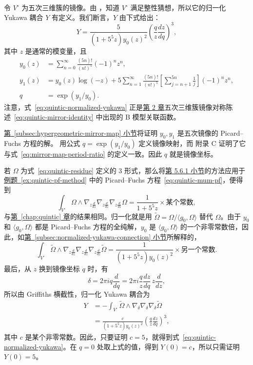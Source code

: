 \begin{example}\label{ex:quintic-normalized-yukawa}
令 $V^\circ$ 为五次三维簇的镜像。由 ，知道 $V^\circ$ 满足整性猜想，所以它的归一化 Yukawa 耦合 $Y$ 有定义。我们断言，$Y$ 由下式给出：
\begin{equation}\label{eq:quintic-normalized-yukawa}
Y=\frac{5}{(1+5^5z)y_0(z)^2}\left(\frac qz\frac{dz}{dq}\right)^3,
\end{equation}
其中 $z$ 是通常的模变量，且
\[
\begin{aligned}
y_0(z)&=\sum_{n=0}^\infty\frac{(5n)!}{(n!)^5}(-1)^nz^n,\\
y_1(z)&=y_0(z)\log(-z)+5\sum_{n=1}^\infty\frac{(5n)!}{(n!)^5}
\left[\sum_{j=n+1}^{5n}\frac1j\right](-1)^nz^n,\\
q&=\exp(y_1/y_0).
\end{aligned}
\]
注意，式~\eqref{eq:quintic-normalized-yukawa} 正是\hyperref[chap:quintic]{第 2 章}五次三维簇镜像对称陈述~\eqref{eq:quintic-mirror-identity} 中出现的 B 模型关联函数。

\hyperref[subsec:hypergeometric-mirror-map]{第~\ref*{subsec:hypergeometric-mirror-map} 小节}将证明 $y_0,y_1$ 是五次镜像的 Picard--Fuchs 方程的解。 用公式 $q=\exp(y_1/y_0)$ 定义镜像映射，而  附录 C 证明了它与式~\eqref{eq:mirror-map-period-ratio} 的定义一致。因此 $q$ 就是镜像坐标。

若 $\Omega$ 为式~\eqref{eq:quintic-residue} 定义的 $3$ 形式，那么将\hyperref[subsec:yukawa-one-dimensional]{第 5.6.1 小节}的方法应用于\hyperref[ex:quintic-pf-method]{例题~\ref*{ex:quintic-pf-method}} 中的 Picard--Fuchs 方程~\eqref{eq:quintic-mum-pf}，便得到
\[
\int_{V^\circ}\Omega\wedge\nabla_{z\frac d{dz}}\nabla_{z\frac d{dz}}\nabla_{z\frac d{dz}}\Omega
=\frac1{1+5^5z}\times\text{某个常数},
\]
与\hyperref[chap:quintic]{第~\ref*{chap:quintic} 章}的结果相同。归一化就是用 $\widetilde\Omega=\Omega/\langle g_0,\Omega\rangle$ 替代 $\Omega$。由于 $y_0$ 和 $\langle g_0,\Omega\rangle$ 都是 Picard--Fuchs 方程的全纯解，$y_0$ 是 $\langle g_0,\Omega\rangle$ 的一个非零常数倍，因此，如\hyperref[subsec:normalized-yukawa-connection]{第~\ref*{subsec:normalized-yukawa-connection} 小节}所解释的，
\[
\int_{V^\circ}\widetilde\Omega\wedge\nabla_{z\frac d{dz}}\nabla_{z\frac d{dz}}\nabla_{z\frac d{dz}}\widetilde\Omega
=\frac1{(1+5^5z)y_0(z)^2}\times\text{另一个常数}.
\]
最后，从 $z$ 换到镜像坐标 $q$ 时，有
\[
\delta=2\pi i q\frac d{dq}=2\pi i\frac qz\frac{dz}{dq}\,z\frac d{dz},
\]
所以由 Griffiths 横截性，归一化 Yukawa 耦合为
\begin{equation}\label{eq:quintic-yukawa-undetermined}
\begin{aligned}
Y&=-\int_{V^\circ}\widetilde\Omega\wedge\nabla_\delta\nabla_\delta\nabla_\delta\widetilde\Omega\\
&=\frac{c}{(1+5^5z)y_0(z)^2}\left(\frac qz\frac{dz}{dq}\right)^3,
\end{aligned}
\end{equation}
其中 $c$ 是某个非零常数。因此，只要证明 $c=5$，就得到式~\eqref{eq:quintic-normalized-yukawa}。在 $q=0$ 处取上式的值，得到 $Y(0)=c$，所以只需证明 $Y(0)=5$。


\end{example}
